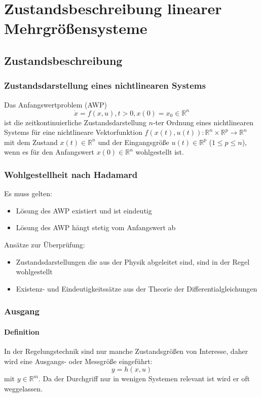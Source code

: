 \chapter{Zustandsbeschreibung linearer Mehrgrößensysteme}
\section{Zustandsbeschreibung}
\subsection{Zustandsdarstellung eines nichtlinearen Systems}
Das Anfangswertproblem (AWP)
\begin{equation}
    \dot{x} = f(x, u), t > 0, x(0) = x_0 \in \mathbb{R}^n
\end{equation}
ist die zeitkontinuierliche Zustandsdarstellung $n$-ter Ordnung eines nichtlinearen
Systems für eine nichtlineare Vektorfunktion $f(x(t), u(t)): \mathbb{R}^n \times
\mathbb{R}^p \to \mathbb{R}^n$ mit dem Zustand $x(t) \in \mathbb{R}^n$ und der
Eingangsgröße $u(t) \in \mathbb{R}^p$ ($1 \leq p \leq n$), wenn es für den Anfangswert
$x(0) \in \mathbb{R}^n$ wohlgestellt ist.

\subsection{Wohlgestellheit nach Hadamard}
Es muss gelten:
\begin{itemize}
    \item Lösung des AWP existiert und ist eindeutig
    \item Lösung des AWP hängt stetig vom Anfangswert ab
\end{itemize}

Ansätze zur Überprüfung:
\begin{itemize}
    \item Zustandsdarstellungen die aus der Physik abgeleitet sind, sind in der Regel
        wohlgestellt
    \item Existenz- und Eindeutigkeitssätze aus der Theorie der Differentialgleichungen
\end{itemize}

\subsection{Ausgang}
\subsubsection{Definition}
In der Regelungstechnik sind nur manche Zustandsgrößen von Interesse, daher wird
eine Ausgangs-  oder Messgröße eingeführt:
\begin{equation}
    y = h(x,u)
\end{equation}
mit $y \in \mathbb{R}^m$. Da der Durchgriff nur in wenigen Systemen relevant ist
wird er oft weggelassen.


